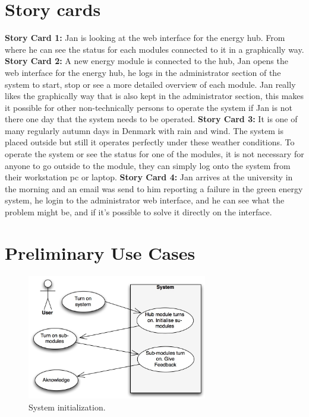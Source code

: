 \section{Story cards}
\textbf{Story Card 1:} Jan is looking at the web interface for the energy hub. From where he can see the status for each modules connected to it
in a graphically way.
\p
\textbf{Story Card 2:} A new energy module is connected to the hub, Jan opens the web interface for the energy hub, he logs in the administrator section of the system
to start, stop or see a more detailed overview of each module.
Jan really likes the graphically way that is also kept in the administrator section, this makes it possible for other
non-technically persons to operate the system if Jan is not there one day that the system needs to be operated.
\p
\textbf{Story Card 3:} It is one of many regularly autumn days in Denmark with rain and wind. The system is placed outside
but still it operates perfectly under these weather conditions. To operate the system or see the status for one of the modules,
it is not necessary for anyone to go outside to the module, they can simply log onto the system from their workstation pc or laptop.
\p
\textbf{Story Card 4:} Jan arrives at the university in the morning and an email was send to him reporting a failure in the green energy system, he login to the administrator web interface, and he can see what the problem might be, and if it's possible to solve it directly on the interface.
\p
\section{Preliminary Use Cases}

\begin{figure}[H]
	\begin{centering}
		\includegraphics[width=0.7\textwidth]{images/usecases1.jpg}
		\caption{System initialization. }
	\end{centering}
\end{figure}

